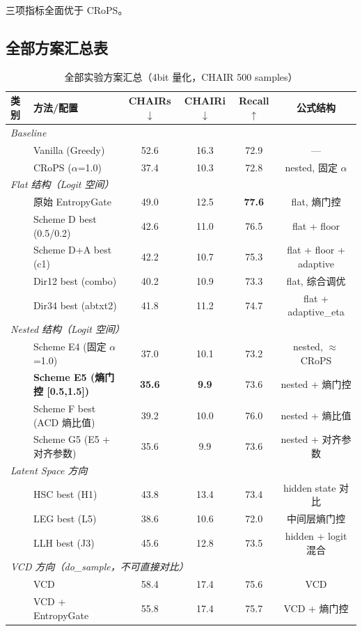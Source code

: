 \documentclass[12pt,a4paper]{ctexart}
\begin{document}
三项指标全面优于 CRoPS。

\subsection{全部方案汇总表}

\begin{table}[H]
\centering
\caption{全部实验方案汇总（4bit 量化，CHAIR 500 samples）}
\label{tab:all_methods}
\small
\begin{tabular}{llcccc}
\toprule
\textbf{类别} & \textbf{方法/配置} & \textbf{CHAIRs$\downarrow$} & \textbf{CHAIRi$\downarrow$} & \textbf{Recall$\uparrow$} & \textbf{公式结构} \\
\midrule
\multicolumn{6}{l}{\textit{Baseline}} \\
& Vanilla (Greedy) & 52.6 & 16.3 & 72.9 & — \\
& CRoPS ($\alpha$=1.0) & 37.4 & 10.3 & 72.8 & nested, 固定 $\alpha$ \\
\midrule
\multicolumn{6}{l}{\textit{Flat 结构（Logit 空间）}} \\
& 原始 EntropyGate & 49.0 & 12.5 & \textbf{77.6} & flat, 熵门控 \\
& Scheme D best (0.5/0.2) & 42.6 & 11.0 & 76.5 & flat + floor \\
& Scheme D+A best (c1) & 42.2 & 10.7 & 75.3 & flat + floor + adaptive \\
& Dir12 best (combo) & 40.2 & 10.9 & 73.3 & flat, 综合调优 \\
& Dir34 best (abtxt2) & 41.8 & 11.2 & 74.7 & flat + adaptive\_eta \\
\midrule
\multicolumn{6}{l}{\textit{Nested 结构（Logit 空间）}} \\
& Scheme E4 (固定 $\alpha$=1.0) & 37.0 & 10.1 & 73.2 & nested, $\approx$CRoPS \\
& \textbf{Scheme E5 (熵门控 [0.5,1.5])} & \textbf{35.6} & \textbf{9.9} & 73.6 & nested + 熵门控 \\
& Scheme F best (ACD 熵比值) & 39.2 & 10.0 & 76.0 & nested + 熵比值 \\
& Scheme G5 (E5 + 对齐参数) & 35.6 & 9.9 & 73.6 & nested + 对齐参数 \\
\midrule
\multicolumn{6}{l}{\textit{Latent Space 方向}} \\
& HSC best (H1) & 43.8 & 13.4 & 73.4 & hidden state 对比 \\
& LEG best (L5) & 38.6 & 10.6 & 72.0 & 中间层熵门控 \\
& LLH best (J3) & 45.6 & 12.8 & 73.5 & hidden + logit 混合 \\
\midrule
\multicolumn{6}{l}{\textit{VCD 方向（do\_sample，不可直接对比）}} \\
& VCD & 58.4 & 17.4 & 75.6 & VCD \\
& VCD + EntropyGate & 55.8 & 17.4 & 75.7 & VCD + 熵门控 \\
\bottomrule
\end{tabular}
\end{table}
\end{document}
